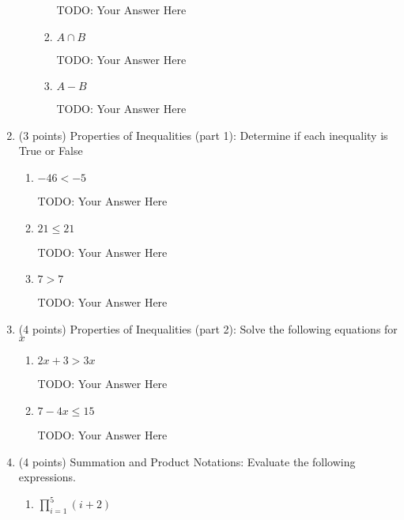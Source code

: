 \documentclass{article}
\begin{document}
\begin{enumerate}
\begin{enumerate}
\begin{enumerate}
        {\color{red} TODO: Your Answer Here}
        
                \item $A\cap B$
                     
        {\color{red} TODO: Your Answer Here}
        
                \item $A - B$
                     
        {\color{red} TODO: Your Answer Here}
        

            \end{enumerate}    

    \end{enumerate}
    
    \item{\large (3 points) Properties of Inequalities (part 1): Determine if each inequality is True or False}
    \begin{enumerate}
        \item  $-46 < -5$
             
        {\color{red} TODO: Your Answer Here}
        
        \item $21 \leq 21$
             
        {\color{red} TODO: Your Answer Here}
        
        \item $7 > 7 $
             
        {\color{red} TODO: Your Answer Here}
        
    \end{enumerate}
    
    \item{\large (4 points) Properties of Inequalities (part 2): Solve the following equations for $x$}
    \begin{enumerate}
        \item $2x+3 > 3x$
             
        {\color{red} TODO: Your Answer Here}
        
        \item $7-4x \leq 15$
             
        {\color{red} TODO: Your Answer Here}
        
    \end{enumerate}
    

    \item{\large (4 points) Summation and Product Notations: Evaluate the following expressions.}
    \begin{enumerate}
            \item $\prod\limits_{i=1}^5 (i+2)$
                 

\end{enumerate}
\end{enumerate}
\end{document}
